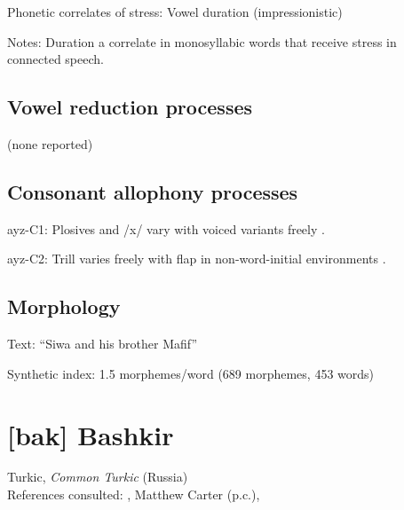 {\begin{appendixdesc}
\item[Phonetic correlates of stress:] Vowel duration (impressionistic)

\item[Notes:] Duration a correlate in monosyllabic words that receive stress in connected speech.
\end{appendixdesc}
\subsection*{Vowel reduction processes}

(none reported)
\subsection*{Consonant allophony processes}
\begin{appendixdesc}

\item[ayz-C1:] Plosives and /x/ vary with voiced variants freely \citep[21--22]{Dol2007}.

\item[ayz-C2:] Trill varies freely with flap in non-word-initial environments \citep[24]{Dol2007}.
\end{appendixdesc}
\subsection*{Morphology}

\begin{appendixdesc}

\item[Text:] “Siwa and his brother Mafif” \citep[284--291]{Dol2007}

\item[Synthetic index:] 1.5 morphemes/word (689 morphemes, 453 words)
\end{appendixdesc}

\section*{[bak] Bashkir}  %
Turkic, \textit{Common Turkic} (Russia)\medskip\\
References consulted: \citet{BerksonEtAl2016}, Matthew Carter (p.c.), \citet{Poppe1964}

}
